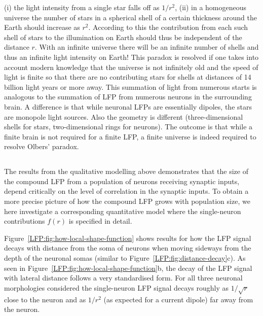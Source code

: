 (i) the light intensity from a single star falls off as $1/r^2$, (ii) in a homogeneous universe the number of stars in a spherical shell of a certain thickness around the Earth should increase as $r^2$. According to this the contribution from each such shell of stars to the illumination on Earth should thus be independent of the distance $r$. With an infinite universe there will be an infinite number of shells and thus an infinite light intensity on Earth! This paradox is resolved if one takes into account modern knowledge that the universe is not infinitely old and the speed of light is finite so that there are no contributing stars for shells at distances of 14 billion light years or more away. This summation of light from numerous starts is analogous to the summation of LFP from numerous neurons in the surrounding brain. A difference is that while neuronal LFPs are essentially dipoles, the stars are monopole light sources. Also the geometry is different (three-dimensional shells for stars, two-dimensional rings for neurons). The outcome is that while a finite brain is not required for a finite LFP, a finite universe is indeed required to resolve Olbers' paradox.

\subsection{}

The results from the qualitative modelling above demonstrates that the size of the compound LFP 
from a population of neurons receiving synaptic inputs, depend critically on the level of 
correlation in the synaptic inputs. To obtain a more
precise picture of how the compound LFP grows with population size, we here investigate a 
corresponding quantitative model where the single-neuron contributions $f(r)$ is specified in detail.

Figure~\ref{LFP:fig:how-local-shape-function} shows results for how the LFP signal decays with distance from the soma of neurons when moving sideways from the depth of the neuronal somas
(similar to  Figure~\ref{LFP:fig:distance-decay}c). As seen in Figure~\ref{LFP:fig:how-local-shape-function}b, the decay of the LFP signal with lateral distance follows a very standardised form. For all three neuronal morphologies considered the single-neuron LFP signal decays roughly as $1/\sqrt{r}$ close to the neuron and as $1/r^2$ (as expected for a current dipole) far away from the neuron. 

